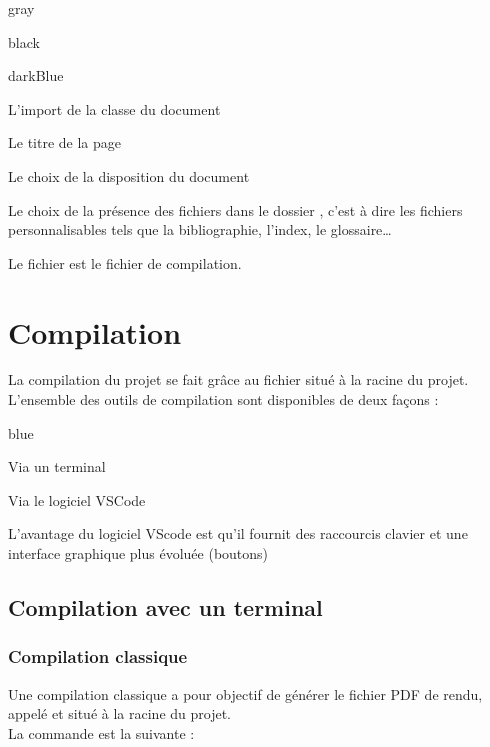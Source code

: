 {\begin{items}{gray}{\faFolder}
\begin{items}{black}{\Triangle}
        \begin{items}{darkBlue}{\Triangle}
            \item L'import de la classe du document
            \item Le titre de la page
            \item Le choix de la disposition du document
            \item Le choix de la présence des fichiers dans le dossier , c'est à dire les fichiers 
            personnalisables tels que la bibliographie, l'index, le glossaire\ldots
        \end{items} 
        \item Le fichier  est le fichier de compilation. 
    \end{items}
\end{items}\chapter{Compilation}

La compilation du projet se fait grâce au fichier  situé à la racine du projet.\\
L'ensemble des outils de compilation sont disponibles de deux façons :

\begin{items}{blue}{\Bullet}
    \item Via un terminal
    \item Via le logiciel VSCode
\end{items}

L'avantage du logiciel VScode est qu'il fournit des raccourcis clavier et une interface graphique plus évoluée (boutons)


\section{Compilation avec un terminal}


\subsection{Compilation classique}

Une compilation classique a pour objectif de générer le fichier PDF de rendu, appelé  et situé à la 
racine du projet.\\

La commande est la suivante :

}
